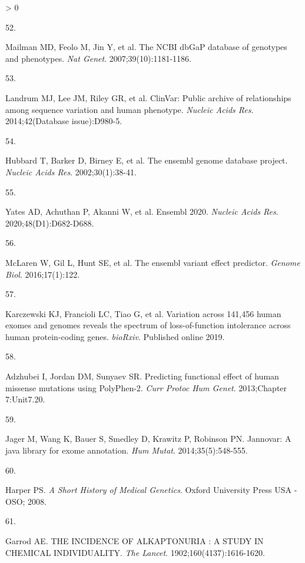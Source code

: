 \documentclass[11pt,letterpaper,oneside]{book}
\newlength{\cslhangindent}
\newlength{\csllabelwidth}
\newenvironment{CSLReferences}[3] %
 {%
  \setlength{\parindent}{0pt}
  \ifodd #1 \everypar{\setlength{\hangindent}{\cslhangindent}}\ignorespaces\fi
  \ifnum #2 > 0
  \setlength{\parskip}{#2\baselineskip}
  \fi
 }%
 {}
\newcommand{\CSLLeftMargin}[1]{\parbox[t]{\maxof{\widthof{#1}}{\csllabelwidth}}{#1}}
\newcommand{\CSLRightInline}[1]{\parbox[t]{\linewidth-\csllabelwidth}{#1}\newline}
\begin{document}
\begin{CSLReferences}{0}{0}
\leavevmode\hypertarget{ref-mailman:2007aa}{}%
\CSLLeftMargin{52. }
\CSLRightInline{Mailman MD, Feolo M, Jin Y, et al. The NCBI dbGaP database of genotypes and phenotypes. \emph{Nat Genet}. 2007;39(10):1181-1186.}

\leavevmode\hypertarget{ref-landrum:2014aa}{}%
\CSLLeftMargin{53. }
\CSLRightInline{Landrum MJ, Lee JM, Riley GR, et al. ClinVar: Public archive of relationships among sequence variation and human phenotype. \emph{Nucleic Acids Res}. 2014;42(Database issue):D980-5.}

\leavevmode\hypertarget{ref-hubbard:2002aa}{}%
\CSLLeftMargin{54. }
\CSLRightInline{Hubbard T, Barker D, Birney E, et al. The ensembl genome database project. \emph{Nucleic Acids Res}. 2002;30(1):38-41.}

\leavevmode\hypertarget{ref-yates:2020aa}{}%
\CSLLeftMargin{55. }
\CSLRightInline{Yates AD, Achuthan P, Akanni W, et al. Ensembl 2020. \emph{Nucleic Acids Res}. 2020;48(D1):D682-D688.}

\leavevmode\hypertarget{ref-mclaren:2016aa}{}%
\CSLLeftMargin{56. }
\CSLRightInline{McLaren W, Gil L, Hunt SE, et al. The ensembl variant effect predictor. \emph{Genome Biol}. 2016;17(1):122.}

\leavevmode\hypertarget{ref-karczewski:2019aa}{}%
\CSLLeftMargin{57. }
\CSLRightInline{Karczewski KJ, Francioli LC, Tiao G, et al. Variation across 141,456 human exomes and genomes reveals the spectrum of loss-of-function intolerance across human protein-coding genes. \emph{bioRxiv}. Published online 2019.}

\leavevmode\hypertarget{ref-adzhubei:2013aa}{}%
\CSLLeftMargin{58. }
\CSLRightInline{Adzhubei I, Jordan DM, Sunyaev SR. Predicting functional effect of human missense mutations using PolyPhen-2. \emph{Curr Protoc Hum Genet}. 2013;Chapter 7:Unit7.20.}

\leavevmode\hypertarget{ref-jager:2014aa}{}%
\CSLLeftMargin{59. }
\CSLRightInline{Jager M, Wang K, Bauer S, Smedley D, Krawitz P, Robinson PN. Jannovar: A java library for exome annotation. \emph{Hum Mutat}. 2014;35(5):548-555.}

\leavevmode\hypertarget{ref-harper:2008aa}{}%
\CSLLeftMargin{60. }
\CSLRightInline{Harper PS. \emph{A Short History of Medical Genetics}. Oxford University Press USA - OSO; 2008.}

\leavevmode\hypertarget{ref-garrod:1902aa}{}%
\CSLLeftMargin{61. }
\CSLRightInline{Garrod AE. THE INCIDENCE OF ALKAPTONURIA : A STUDY IN CHEMICAL INDIVIDUALITY. \emph{The Lancet}. 1902;160(4137):1616-1620.}


\end{CSLReferences}
\end{document}
